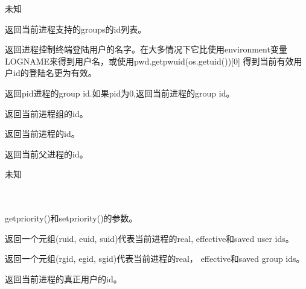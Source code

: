 \noindent{\color{red}{os.getgrouplist(user, group):}}
\par{未知}\\

\noindent{\color{red}{os.getgroups():}}
\par{返回当前进程支持的groups的id列表。}\\

\noindent{\color{red}{os.getlogin():}}
\par{返回进程控制终端登陆用户的名字。在大多情况下它比使用environment变量LOGNAME来得到用户名，或使用pwd.getpwuid(os.getuid())[0] 得到当前有效用户id的登陆名更为有效。}\\

\noindent{\color{red}{os.getpgid(pid):}}
\par{返回pid进程的group id.如果pid为0,返回当前进程的group id。}\\

\noindent{\color{red}{os.getpgrp():}}
\par{返回当前进程组的id。}\\

\noindent{\color{red}{os.getpid():}}
\par{返回当前进程的id。}\\

\noindent{\color{red}{os.getppid():}}
\par{返回当前父进程的id。}\\

\noindent{\color{red}{os.getpriority(which, who):}}
\par{未知}\\

\noindent{\color{red}{os.PRIO\_PROCESS}}\\
\noindent{\color{red}{os.PRIO\_PGRP}}\\
\noindent{\color{red}{os.PRIO\_USER}}
\par{getpriority()和setpriority()的参数。}\\

\noindent{\color{red}{os.getresuid():}}
\par{返回一个元组(ruid, euid, suid)代表当前进程的real, effective和saved user ids。}\\

\noindent{\color{red}{os.getresgid():}}
\par{返回一个元组(rgid, egid, sgid)代表当前进程的real， effective和saved group ids。}\\

\noindent{\color{red}{os.getuid():}}
\par{返回当前进程的真正用户的id。}\\

